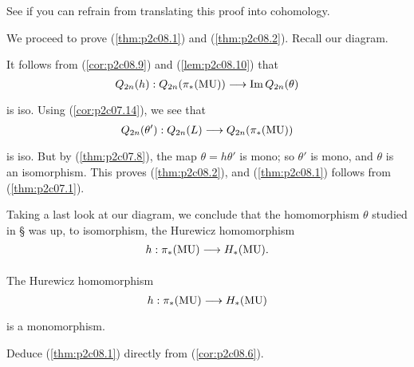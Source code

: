 \documentclass[../main]{subfiles}
\begin{document}
\begin{exercise}
See if you can refrain from translating this proof into cohomology. 
\end{exercise}

We proceed to prove (\ref{thm:p2c08.1}) and (\ref{thm:p2c08.2}). Recall our diagram.

\begin{center}
\end{center}
It follows from (\ref{cor:p2c08.9}) and (\ref{lem:p2c08.10}) that \[Q_{2n}(h) : Q_{2n}(\pi_\ast(\mathrm{MU})) \lar{} \mathrm{Im} \, Q_{2n}(\theta)\] is iso. Using (\ref{cor:p2c07.14}), we see that \[Q_{2n}(\theta') : Q_{2n}(L) \lar{} Q_{2n}(\pi_\ast(\mathrm{MU}))\] is iso. But by (\ref{thm:p2c07.8}), the map $\theta = h \theta'$ is mono; so $\theta'$ is mono, and $\theta$ is an isomorphism. This proves (\ref{thm:p2c08.2}), and (\ref{thm:p2c08.1}) follows from (\ref{thm:p2c07.1}). 

Taking a last look at our diagram, we conclude that the homomorphism $\theta$ studied in \S{} was up, to isomorphism, the Hurewicz homomorphism \[h : \pi_\ast(\mathrm{MU}) \lar{} H_\ast(\mathrm{MU}).\] 

\begin{corollary}
\label{cor:p2c08.11}
The Hurewicz homomorphism \[h : \pi_\ast(\mathrm{MU}) \lar{} H_\ast(\mathrm{MU})\] is a monomorphism. 
\end{corollary}

\begin{exercise}
Deduce (\ref{thm:p2c08.1}) directly from (\ref{cor:p2c08.6}).
\end{exercise}
\end{document}
